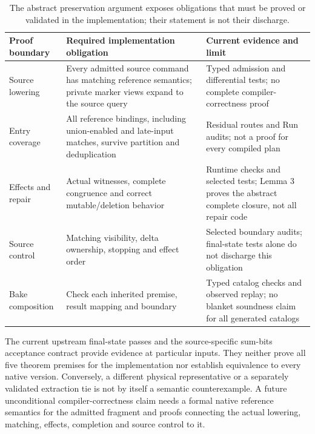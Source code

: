 \begin{table}[ht]\centering\small
\begin{tabularx}{\linewidth}{lXX}\toprule
Proof boundary & Required implementation obligation & Current evidence and limit\\\midrule
Source lowering & Every admitted source command has matching reference semantics; private marker views expand to the source query & Typed admission and differential tests; no complete compiler-correctness proof\\
Entry coverage & All reference bindings, including union-enabled and late-input matches, survive partition and deduplication & Residual routes and Run audits; not a proof for every compiled plan\\
Effects and repair & Actual witnesses, complete congruence and correct mutable/deletion behavior & Runtime checks and selected tests; Lemma 3 proves the abstract complete closure, not all repair code\\
Source control & Matching visibility, delta ownership, stopping and effect order & Selected boundary audits; final-state tests alone do not discharge this obligation\\
Bake composition & Check each inherited premise, result mapping and boundary & Typed catalog checks and observed replay; no blanket soundness claim for all generated catalogs\\\bottomrule
\end{tabularx}
\caption{The abstract preservation argument exposes obligations that must be
proved or validated in the implementation; their statement is not their discharge.}
\end{table}

The current upstream final-state passes and the source-specific sum-bits
acceptance contract provide evidence at particular inputs. They neither prove
all five theorem premises for the implementation nor establish equivalence to
every native version. Conversely, a different physical representative or a
separately validated extraction tie is not by itself a semantic counterexample.
A future unconditional compiler-correctness claim needs a formal native reference
semantics for the admitted fragment and proofs connecting the actual lowering,
matching, effects, completion and source control to it.
